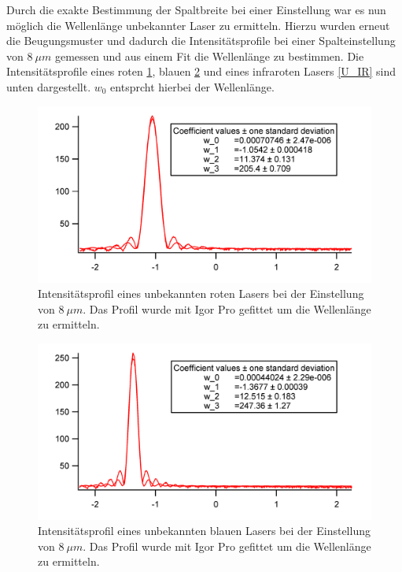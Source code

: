 Durch die exakte Bestimmung der Spaltbreite bei einer Einstellung war es nun möglich die Wellenlänge unbekannter Laser zu  ermitteln. Hierzu wurden erneut die Beugungsmuster und dadurch die Intensitätsprofile bei einer Spalteinstellung von $8~\mu m$ gemessen und aus einem Fit die Wellenlänge zu bestimmen. Die Intensitätsprofile eines roten \ref{U_Rot}, blauen \ref{U_Blau} und eines infraroten Lasers \ref{U_IR} sind unten dargestellt. $w_0$ entsprcht hierbei der Wellenlänge. 

\begin{figure}[H]
	\centering	
	\begin{minipage}{1\textwidth}
		\includegraphics[width=\columnwidth]{180618/Graph_Rot.png}
	\end{minipage}
	\caption{Intensitätsprofil eines unbekannten roten Lasers bei der Einstellung von $8~\mu m$. Das Profil wurde mit Igor Pro gefittet um die Wellenlänge zu ermitteln. }
	\label{U_Rot}
\end{figure}
\begin{figure}[H]
	\centering	
	\begin{minipage}{1\textwidth}
		\includegraphics[width=\columnwidth]{180618/Graph_Blau.png}
	\end{minipage}
	\caption{Intensitätsprofil eines unbekannten blauen Lasers bei der Einstellung von $8~\mu m$. Das Profil wurde mit Igor Pro gefittet um die Wellenlänge zu ermitteln. }
	\label{U_Blau}
\end{figure}
